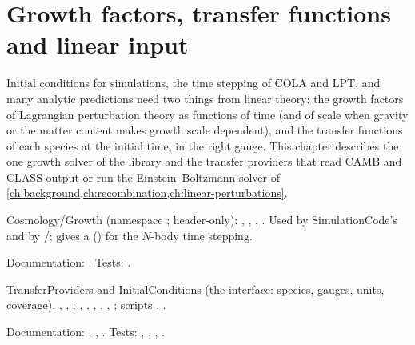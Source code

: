 \chapter{Growth factors, transfer functions and linear input}\label{ch:growth-transfer}

Initial conditions for simulations, the time stepping of COLA and LPT, and many analytic predictions need two things
from linear theory: the growth factors of Lagrangian perturbation theory as functions of time (and of scale when
gravity or the matter content makes growth scale dependent), and the transfer functions of each species at the
initial time, in the right gauge. This chapter describes the one growth solver of the library and the transfer
providers that read CAMB and CLASS output or run the Einstein--Boltzmann solver of
\cref{ch:background,ch:recombination,ch:linear-perturbations}.

\begin{modulebox}{Cosmology/Growth}
 (namespace ; header-only): ,
, , . Used by SimulationCode's
 and by /;  gives a
 () for the $N$-body time stepping.\par
Documentation: . Tests: .
\end{modulebox}
\begin{modulebox}{TransferProviders and InitialConditions}
 (the interface: species, gauges, units, coverage),
, , ;
, ,
, , , ;
scripts ,
.\par
Documentation: , ,
. Tests: , ,
, .
\end{modulebox}

